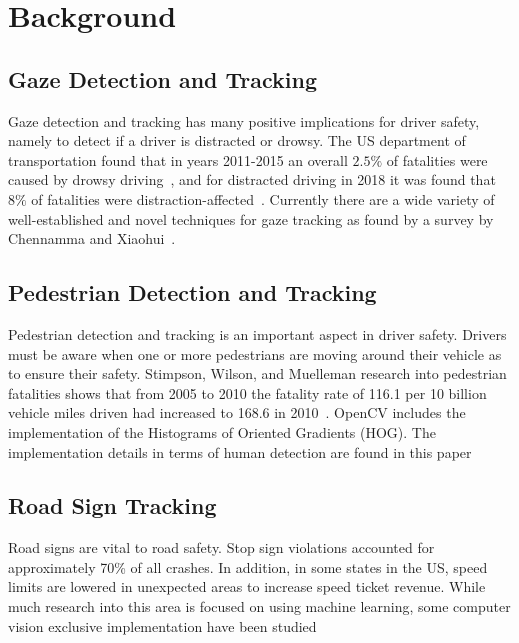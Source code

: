 \section{Background}
\subsection{Gaze Detection and Tracking}

Gaze detection and tracking has many positive implications for driver safety, namely to detect if a driver is distracted or drowsy. The US department of transportation found that in years 2011-2015 an overall $2.5\%$ of fatalities were caused by drowsy driving~\cite{CrashDrowsy}, and for distracted driving in 2018 it was found that $8\%$ of fatalities were distraction-affected~\cite{CrashDistracted}. Currently there are a wide variety of well-established and novel techniques for gaze tracking as found by a survey by Chennamma and Xiaohui~\cite{chennamma2013survey}. 

\subsection{Pedestrian Detection and Tracking}

Pedestrian detection and tracking is an important aspect in driver safety. Drivers must be aware when one or more pedestrians are moving around their vehicle as to ensure their safety. Stimpson, Wilson, and Muelleman research into pedestrian fatalities shows that from 2005 to 2010 the fatality rate of 116.1 per 10 billion vehicle miles driven had increased to 168.6 in 2010~\cite{PedestrianFatalities}.
OpenCV includes the implementation of the Histograms of Oriented Gradients (HOG).
The implementation details in terms of human detection are found in this paper\cite{HOGHumanDetection}

\subsection{Road Sign Tracking}
Road signs are vital to road safety. 
Stop sign violations accounted for approximately 70\% of all crashes. %
In addition, in some states in the US, speed limits are lowered in unexpected areas to increase speed ticket revenue. %
While much research into this area is focused on using machine learning, some computer vision exclusive implementation have been studied %
